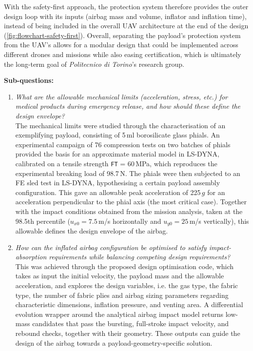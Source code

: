 With the safety-first approach, the protection system therefore provides the outer design loop with its inputs (airbag mass and volume, inflator and inflation time), instead of being included in the overall UAV architecture at the end of the design (\cref{fig:flowchart-safety-first}). Overall, separating the payload's protection system from the UAV's allows for a modular design that could be implemented across different drones and missions while also easing certification, which is ultimately the long-term goal of \textit{Politecnico di Torino}'s research group.


\textbf{Sub-questions:}
\begin{enumerate}
  \item \textit{What are the allowable mechanical limits (acceleration, stress, etc.) for medical products during emergency release, and how should these define the design envelope?}\\
  The mechanical limits were studied through the characterisation of an exemplifying payload, consisting of 5\,ml borosilicate glass phials. An experimental campaign of 76 compression tests on two batches of phials provided the basis for an approximate material model in LS-DYNA, calibrated on a tensile strength \texttt{FT} = 60\,MPa, which reproduces the experimental breaking load of 98.7\,N. The phials were then subjected to an FE sled test in LS-DYNA, hypothesising a certain payload assembly configuration. This gave an allowable peak acceleration of 225\,$g$ for an acceleration perpendicular to the phial axis (the most critical case). Together with the impact conditions obtained from the mission analysis, taken at the 98.5th percentile ($u_{x0} = 7.5$\,m/s horizontally and $u_{y0} = 25$\,m/s vertically), this allowable defines the design envelope of the airbag.

  \item \textit{How can the inflated airbag configuration be optimised to satisfy impact-absorption requirements while balancing competing design requirements?}\\
  This was achieved through the proposed design optimisation code, which takes as input the initial velocity, the payload mass and the allowable acceleration, and explores the design variables, i.e. the gas type, the fabric type, the number of fabric plies and airbag sizing parameters regarding characteristic dimensions, inflation pressure, and venting area. A differential evolution wrapper around the analytical airbag impact model returns low-mass candidates that pass the bursting, full-stroke impact velocity, and rebound checks, together with their geometry. These outputs can guide the design of the airbag towards a payload-geometry-specific solution.


\end{enumerate}
